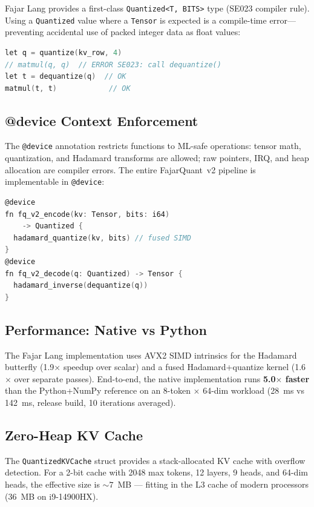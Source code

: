 \documentclass{article}
\begin{document}
Fajar Lang provides a first-class \texttt{Quantized<T, BITS>} type
(SE023 compiler rule). Using a \texttt{Quantized} value where a
\texttt{Tensor} is expected is a compile-time error---preventing
accidental use of packed integer data as float values:

\begin{lstlisting}[language=C,caption={SE023: Quantized type safety}]
let q = quantize(kv_row, 4)
// matmul(q, q)  // ERROR SE023: call dequantize()
let t = dequantize(q)  // OK
matmul(t, t)            // OK
\end{lstlisting}

\subsection{@device Context Enforcement}

The \texttt{@device} annotation restricts functions to ML-safe
operations: tensor math, quantization, and Hadamard transforms are
allowed; raw pointers, IRQ, and heap allocation are compiler errors.
The entire FajarQuant~v2 pipeline is implementable in \texttt{@device}:

\begin{lstlisting}[language=C,caption={Full v2 pipeline in @device context}]
@device
fn fq_v2_encode(kv: Tensor, bits: i64)
    -> Quantized {
  hadamard_quantize(kv, bits) // fused SIMD
}
@device
fn fq_v2_decode(q: Quantized) -> Tensor {
  hadamard_inverse(dequantize(q))
}
\end{lstlisting}

\subsection{Performance: Native vs Python}

The Fajar Lang implementation uses AVX2 SIMD intrinsics for the
Hadamard butterfly (1.9$\times$ speedup over scalar) and a fused
Hadamard+quantize kernel (1.6$\times$ over separate passes). End-to-end,
the native implementation runs \textbf{5.0$\times$ faster} than the
Python+NumPy reference on an 8-token $\times$ 64-dim workload
(28~ms vs 142~ms, release build, 10 iterations averaged).

\subsection{Zero-Heap KV Cache}

The \texttt{QuantizedKVCache} struct provides a stack-allocated KV cache
with overflow detection. For a 2-bit cache with 2048 max tokens, 12
layers, 9 heads, and 64-dim heads, the effective size is ${\sim}7$~MB
--- fitting in the L3 cache of modern processors (36~MB on i9-14900HX).
\end{document}
